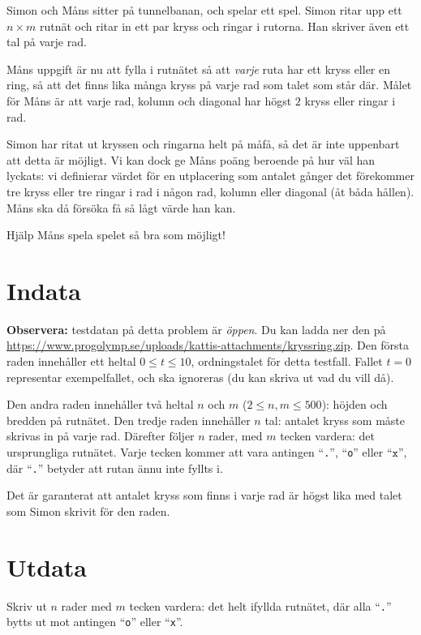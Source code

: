 Simon och Måns sitter på tunnelbanan, och spelar ett spel.
Simon ritar upp ett $n \times m$ rutnät och ritar in ett par kryss och ringar i rutorna.
Han skriver även ett tal på varje rad.

Måns uppgift är nu att fylla i rutnätet så att \emph{varje} ruta har ett kryss eller en ring, så att
det finns lika många kryss på varje rad som talet som står där.
Målet för Måns är att varje rad, kolumn och diagonal har högst $2$ kryss eller ringar i rad.

Simon har ritat ut kryssen och ringarna helt på måfå, så det är inte uppenbart att detta är möjligt.
Vi kan dock ge Måns poäng beroende på hur väl han lyckats: vi definierar värdet för en utplacering
som antalet gånger det förekommer tre kryss eller tre ringar i rad i någon rad, kolumn eller diagonal
(åt båda hållen).
Måns ska då försöka få så lågt värde han kan.

Hjälp Måns spela spelet så bra som möjligt!

\section*{Indata}
\textbf{Observera:} testdatan på detta problem är \emph{öppen}. Du kan ladda ner den på
\href{https://www.progolymp.se/uploads/kattis-attachments/kryssring.zip}{https://www.progolymp.se/uploads/kattis-attachments/kryssring.zip}.
Den första raden innehåller ett heltal $0 \le t \le 10$, ordningstalet för detta testfall.
Fallet $t = 0$ representar exempelfallet, och ska ignoreras (du kan skriva ut vad du vill då).

Den andra raden innehåller två heltal $n$ och $m$ ($2 \le n, m \le 500$): höjden och bredden på rutnätet.
Den tredje raden innehåller $n$ tal: antalet kryss som måste skrivas in på varje rad.
Därefter följer $n$ rader, med $m$ tecken vardera: det ursprungliga rutnätet.
Varje tecken kommer att vara antingen ``\texttt{.}'', ``\texttt{o}'' eller ``$\texttt{x}$'',
där ``\texttt{.}'' betyder att rutan ännu inte fyllts i.

Det är garanterat att antalet kryss som finns i varje rad är högst lika med talet som Simon skrivit för den raden.

\section*{Utdata}
Skriv ut $n$ rader med $m$ tecken vardera: det helt ifyllda rutnätet, där alla ``\texttt{.}'' bytts
ut mot antingen ``\texttt{o}'' eller ``\texttt{x}''.

